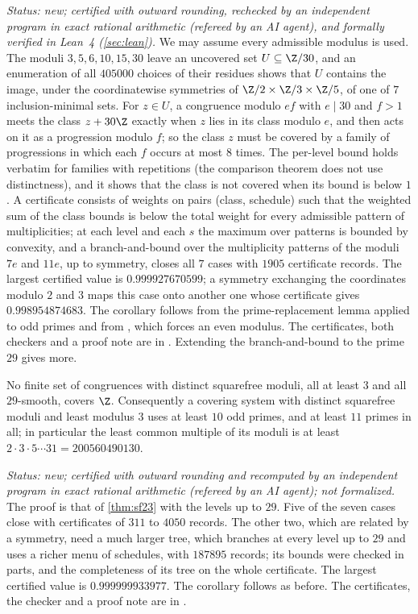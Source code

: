 \emph{Status: new; certified with outward rounding, rechecked by an independent program in exact rational
arithmetic (refereed by an AI agent), and formally verified in Lean~4 (\cref{sec:lean}).} We may assume every admissible modulus is used. The moduli $3,5,6,10,15,30$
leave an uncovered set $U\subseteq\Z/30$, and an enumeration of all $405000$ choices of their residues shows that $U$
contains the image, under the coordinatewise symmetries of $\Z/2\times\Z/3\times\Z/5$, of one of $7$
inclusion-minimal sets. For $z\in U$, a congruence modulo $ef$ with $e\mid30$ and $f>1$ meets the class
$z+30\Z$ exactly when $z$ lies in its class modulo $e$, and then acts on it as a progression modulo $f$; so the
class $z$ must be covered by a family of progressions in which each $f$ occurs at most $8$ times. The per-level
bound holds verbatim for families with repetitions (the comparison theorem does not use distinctness), and it shows
that the class is not covered when its bound is below $1$. A certificate consists of weights on pairs (class,
schedule) such that the weighted sum of the class bounds is below the total weight for every admissible pattern of
multiplicities; at each level and each $s$ the maximum over patterns is bounded by convexity, and a branch-and-bound
over the multiplicity patterns of the moduli $7e$ and $11e$, up to symmetry, closes all $7$ cases with $1905$
certificate records. The largest certified value is $0.999927670599$; a symmetry exchanging the coordinates modulo
$2$ and $3$ maps this case onto another one whose certificate gives $0.998954874683$. The corollary follows from the
prime-replacement lemma applied to odd primes and from \cite[Theorem~1.1]{BBMST2021ES}, which forces an even
modulus. The certificates, both checkers and a proof note are in .
Extending the branch-and-bound to the prime $29$ gives more.

\begin{theorem}\label{thm:sf29}
No finite set of congruences with distinct squarefree moduli, all at least $3$ and all $29$-smooth, covers $\Z$.
Consequently a covering system with distinct squarefree moduli and least modulus $3$ uses at least $10$ odd primes,
and at least $11$ primes in all; in particular the least common multiple of its moduli is at least
$2\cdot3\cdot5\cdots31=200560490130$.
\end{theorem}

\emph{Status: new; certified with outward rounding and recomputed by an independent program in exact rational
arithmetic (refereed by an AI agent); not formalized.} The proof is that of \cref{thm:sf23} with the levels up to
$29$. Five of the seven cases close with certificates of $311$ to $4050$ records. The other two, which are related by
a symmetry, need a much larger tree, which branches at every level up to $29$ and uses a richer menu of schedules,
with $187895$ records; its bounds were checked in parts, and the completeness of its tree on the whole certificate.
The largest certified value is $0.999999933977$. The corollary follows as before. The certificates, the checker and
a proof note are in .

